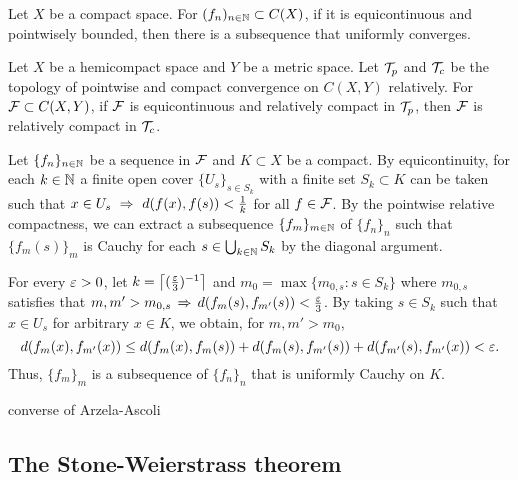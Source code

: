 \documentclass{../crs}
\begin{document}
\begin{thm}
Let $X$ be a compact space.
For $(f_n)_{n\in\mathbb{N}}\subset C(X)$, if it is equicontinuous and pointwisely bounded, then there is a subsequence that uniformly converges.
\end{thm}


\begin{thm}
Let $X$ be a hemicompact space and $Y$ be a metric space.
Let $\mathcal{T}_p$ and $\mathcal{T}_c$ be the topology of pointwise and compact convergence on $C(X,Y)$ relatively.
For $\mathcal{F}\subset C(X,Y)$, if $\mathcal{F}$ is equicontinuous and relatively compact in $\mathcal{T}_p$, then $\mathcal{F}$ is relatively compact in $\mathcal{T}_c$.
\end{thm}
\begin{pf}
Let $\{f_n\}_{n\in\mathbb{N}}$ be a sequence in $\mathcal{F}$ and $K\subset X$ be a compact.
By equicontinuity, for each $k\in\mathbb{N}$ a finite open cover $\{U_s\}_{s\in S_k}$ with a finite set $S_k\subset K$ can be taken such that $x\in U_s\,\impl\,d(f(x),f(s))<\frac1k$ for all $f\in\mathcal{F}$.
By the pointwise relative compactness, we can extract a subsequence $\{f_m\}_{m\in\mathbb{N}}$ of $\{f_n\}_n$ such that $\{f_m(s)\}_m$ is Cauchy for each $s\in\bigcup_{k\in\mathbb{N}}S_k$ by the diagonal argument.

For every $\varepsilon>0$, let $k=\left\lceil(\frac{\varepsilon}3)^{-1}\right\rceil$ and $m_0=\max\{m_{0,s}:s\in S_k\}$ where $m_{0,s}$ satisfies that $m,m'>m_{0,s}\impl d(f_m(s),f_{m'}(s))<\frac\e3$.
By taking $s\in S_k$ such that $x\in U_s$ for arbitrary $x\in K$, we obtain, for $m,m'>m_0$,
\[d(f_m(x),f_{m'}(x))\le d(f_m(x),f_m(s))+d(f_m(s),f_{m'}(s))+d(f_{m'}(s),f_{m'}(x))<\varepsilon.\]
Thus, $\{f_m\}_m$ is a subsequence of $\{f_n\}_n$ that is uniformly Cauchy on $K$.
\end{pf}


converse of Arzela-Ascoli




\subsection{The Stone-Weierstrass theorem}
\end{document}
